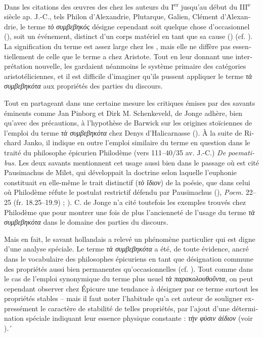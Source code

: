 \documentclass[french,output=paper,colorlinks,citecolor=brown]{../langscibook}
\begin{document}
\begin{otherlanguage}{french}
Dans les citations des œuvres des  chez les auteurs du I\textsuperscript{e}\textsuperscript{r} jusqu’au début du III\textsuperscript{e} siècle ap. J.-C., tels Philon d’Alexandrie, Plutarque, Galien, Clément d’Alexandrie, le terme \textit{τὸ} \textit{συμβεβηκός} désigne cependant soit quelque chose d’occasionnel (), soit un événement, distinct d’un corps matériel en tant que sa cause () (cf. \citealt[153]{DeJonge2008}). La signification du terme est assez large chez les , mais elle ne diffère pas essentiellement de celle que le terme a chez Aristote. Tout en leur donnant une interprétation nouvelle, les  gardaient néanmoins le système primaire des catégories aristotéliciennes, et il est difficile d’imaginer qu’ils pussent appliquer le terme \textit{τὰ συμβεβηκότα} aux propriétés des parties du discours. 

Tout en partageant dans une certaine mesure les critiques émises par des savants éminents comme Jan Pinborg et Dirk M. Schenkeveld, de Jonge adhère, bien qu’avec des précautions, à l’hypothèse de Barwick sur les origines stoïciennes de l’emploi du terme \textit{τὰ συμβεβηκότα} chez Denys d’Halicarnasse (\citealt[151--154]{DeJonge2008}). À la suite de Richard Janko, il indique en outre l’emploi similaire du terme en question dans le traité du philosophe épicurien Philodème (vers 111–40/35 av. J.-C.) \textit{De poematibus.} Les deux savants mentionnent cet usage aussi bien dans le passage où est cité Pausimachus de Milet, qui développait la doctrine selon laquelle l’euphonie constituait en elle-même le trait distinctif (\textit{τὸ ἴδιον}) de la poésie, que dans celui où Philodème réfute le postulat restrictif défendu par Pausimachus (\citealt[182, 268--269 (fr. 74.1--74.6), cf. 300--301 (fr. 94.15--94.21]{Janko2000}),  \textit{Poem.} 22–25 (fr. 18.25–19.9) ; \citealt[155]{DeJonge2008}). C. de Jonge n’a cité toutefois les exemples trouvés chez Philodème que pour montrer une fois de plus l’ancienneté de l’usage du terme \textit{τὰ συμβεβηκότα} dans le domaine des parties du discours.

Mais en fait, le savant hollandais a relevé un phénomène particulier qui est digne d’une analyse spéciale. Le terme \textit{τὰ συμβεβηκότα} a été, de toute évidence, ancré dans le vocabulaire des philosophes épicuriens en tant que désignation commune des propriétés aussi bien permanentes qu’occasionnelles (cf. ). Tout comme dans le cas de l’emploi synonymique du terme plus usuel \textit{τὰ παρακολουθοῦντα}, on peut cependant observer chez Épicure une tendance à désigner par ce terme surtout les propriétés stables – mais il faut noter l’habitude qu’a cet auteur de souligner expressément le caractère de stabilité de telles propriétés, par l’ajout d’une détermination spéciale indiquant leur essence physique constante : \textit{τὴν φύσιν ἀίδιον} (voir ).´


\end{otherlanguage}
\end{document}
